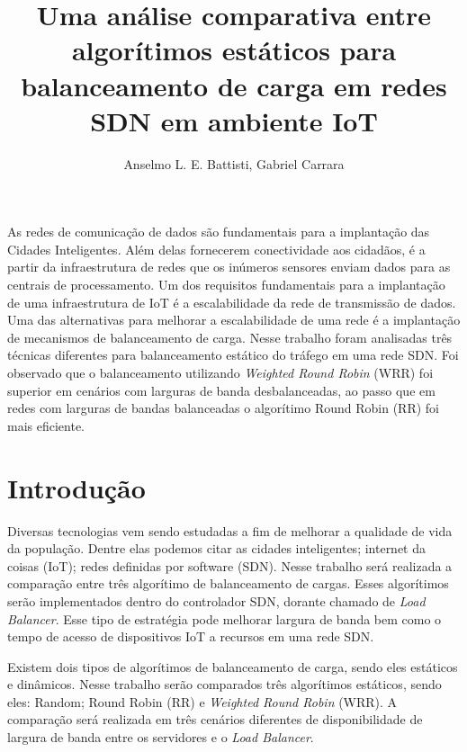 \documentclass[12pt]{article}
\title{Uma análise comparativa entre algorítimos estáticos para balanceamento de carga em redes SDN em ambiente IoT}
\author{Anselmo L. E. Battisti\inst{1}, Gabriel Carrara\inst{1}}
\begin{document}
 

\maketitle

\begin{resumo} 
As redes de comunicação de dados são fundamentais para a implantação das Cidades Inteligentes. Além delas fornecerem conectividade aos cidadãos, é a partir da infraestrutura de redes que os inúmeros sensores enviam dados para as centrais de processamento. Um dos requisitos fundamentais para a implantação de uma infraestrutura de IoT é a escalabilidade da rede de transmissão de dados. Uma das alternativas para melhorar a escalabilidade de uma rede é a implantação de mecanismos de balanceamento de carga. Nesse trabalho foram analisadas três técnicas diferentes para balanceamento estático do tráfego em uma rede SDN. Foi observado que o balanceamento utilizando \textit{Weighted Round Robin} (WRR) foi superior em  cenários com larguras de banda desbalanceadas, ao passo que em redes com larguras de bandas balanceadas o algorítimo Round Robin (RR) foi mais eficiente.
\end{resumo}

\begin{abstract}
    
\end{abstract}

\section{Introdução}

Diversas tecnologias vem sendo estudadas a fim de melhorar a qualidade de vida da população. Dentre elas podemos citar as cidades inteligentes; internet da coisas (IoT); redes definidas por software (SDN). Nesse trabalho será realizada a comparação entre três algorítimo de balanceamento de cargas. Esses algorítimos serão implementados dentro do controlador SDN, dorante chamado de \textit{Load Balancer}. Esse tipo de estratégia pode melhorar largura de banda bem como o tempo de acesso de dispositivos IoT a recursos em uma rede SDN. 

Existem dois tipos de algorítimos de balanceamento de carga, sendo eles estáticos e dinâmicos. Nesse trabalho serão comparados três algorítimos estáticos, sendo eles: Random; Round Robin (RR) e \textit{Weighted Round Robin} (WRR). A comparação será realizada em três cenários diferentes de disponibilidade de largura de banda entre os servidores e o \textit{Load Balancer}.
\end{document}
